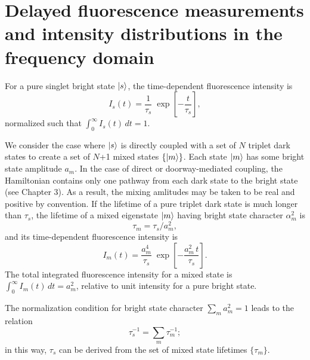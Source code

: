 \documentclass[12pt]{mitthesis}
\begin{document}
\section*{Delayed fluorescence measurements and intensity
  distributions in the frequency domain}

For a pure singlet bright state $\mathinner{|{s}\rangle}$, the time-dependent
fluorescence intensity is
\begin{equation}
  I_s(t) = \frac{1}{\tau_s} \;
           \exp \left[
             -\frac{t}{ \tau_s} 
           \right],
\end{equation}
normalized such that $\int_0^{\infty} I_s(t) \, dt = 1$.

We consider the case where $\mathinner{|{s}\rangle}$ is directly coupled with a set of
$N$ triplet dark states to create a set of $N$+1 mixed states
$\lbrace\mathinner{|{m}\rangle}\rbrace$.  Each state $\mathinner{|{m}\rangle}$ has some bright state
amplitude $a_m$.  In the case of direct or doorway-mediated coupling,
the Hamiltonian contains only one pathway from each dark state to the
bright state (see Chapter 3).  As a result, the mixing amlitudes may
be taken to be real and positive by convention.  If the lifetime of a
pure triplet dark state is much longer than $\tau_s$, the lifetime of
a mixed eigenstate $\mathinner{|{m}\rangle}$ having bright state character
$\alpha_m^2$ is
\begin{equation}
  \label{eq:tau-m}
  \tau_m = \tau_s / a_m^2,
\end{equation}
and its time-dependent fluorescence intensity is
\begin{equation}
  \label{eq:int-m}
  I_m(t) = \frac{a_m^4}{\tau_s} \;
           \exp \left[
             -\frac{a_m^2 \, t}{\tau_s} 
           \right].
\end{equation}
The total integrated fluorescence intensity for a mixed state is
$\int_0^{\infty} I_m(t) \, dt = a_m^2$, relative to unit intensity for
a pure bright state.

The normalization condition for bright state character $\sum_m a_m^2 =
1$ leads to the relation
\begin{equation}
  \tau_s^{-1} = \sum_m \tau_m^{-1};
\end{equation}
in this way, $\tau_s$ can be derived from the set of mixed state
lifetimes $\lbrace \tau_m \rbrace$.



\end{document}
